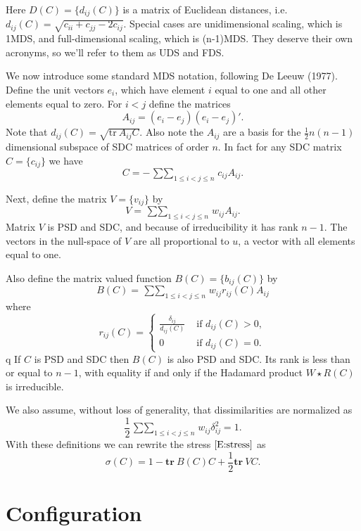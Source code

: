 \documentclass[
  12pt,
]{article}
\begin{document}
Here \(D(C)=\{d_{ij}(C)\}\) is a matrix of Euclidean distances, i.e.
\(d_{ij}(C)=\sqrt{c_{ii}+c_{jj}-2c_{ij}}\). Special cases are
unidimensional scaling, which is 1MDS, and full-dimensional scaling,
which is (n-1)MDS. They deserve their own acronyms, so we'll refer to
them as UDS and FDS.

We now introduce some standard MDS notation, following De Leeuw (1977).
Define the unit vectors \(e_i\), which have element \(i\) equal to one
and all other elements equal to zero. For \(i<j\) define the matrices
\[A_{ij}=(e_i-e_j)(e_i-e_j)'.\] Note that
\(d_{ij}(C)=\sqrt{\text{tr}\ A_{ij}C}\). Also note the \(A_{ij}\) are a
basis for the \(\frac12 n(n-1)\) dimensional subspace of SDC matrices of
order \(n\). In fact for any SDC matrix \(C=\{c_{ij}\}\) we have \[
C=-\mathop{\sum\sum}_{1\leq i<j\leq n}c_{ij}A_{ij}.
\]

Next, define the matrix \(V=\{v_{ij}\}\) by \begin{equation}\label{E:V}
V=\mathop{\sum\sum}_{1\leq i<j\leq n}w_{ij}A_{ij}.
\end{equation} Matrix \(V\) is PSD and SDC, and because of
irreducibility it has rank \(n-1\). The vectors in the null-space of
\(V\) are all proportional to \(u\), a vector with all elements equal to
one.

Also define the matrix valued function \(B(C)=\{b_{ij}(C)\}\) by
\begin{equation}\label{E:B}
B(C)=\mathop{\sum\sum}_{1\leq i<j\leq n}w_{ij}r_{ij}(C)A_{ij}
\end{equation} where \[
r_{ij}(C)=\begin{cases}\frac{\delta_{ij}}{d_{ij}(C)}&\text{ if }d_{ij}(C)>0,\\
0&\text{ if }d_{ij}(C)=0.
\end{cases}
\]q If \(C\) is PSD and SDC then \(B(C)\) is also PSD and SDC. Its rank
is less than or equal to \(n-1\), with equality if and only if the
Hadamard product \(W\star R(C)\) is irreducible.

We also assume, without loss of generality, that dissimilarities are
normalized as \[
\frac12\mathop{\sum\sum}_{1\leq i<j\leq n}w_{ij}\delta_{ij}^2=1.
\] With these definitions we can rewrite the stress \(\eqref{E:stress}\)
as \begin{equation}\label{E:mstress}
\sigma(C)=1-\mathbf{tr}\ B(C)C+\frac12\mathbf{tr}\ VC.
\end{equation}

\hypertarget{configuration}{%
\section{Configuration}\label{configuration}}
\end{document}

